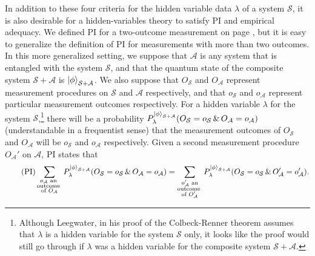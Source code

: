In addition to these four criteria for the hidden variable data $\lambda$ of a system $\mathcal{S}$, it is also desirable for a hidden-variables theory to satisfy PI and empirical adequacy. We defined PI for a two-outcome measurement on page \pageref{PIdef}, but it is easy to generalize the definition of PI for measurements with more than two outcomes. In this more generalized setting, we suppose that $\mathcal{A}$ is any system that is entangled with the system $\mathcal{S}$, and that the quantum state of the composite system $\mathcal{S}+\mathcal{A}$  is $\ket{\phi}_{\mathcal{S}+\mathcal{A}}$. We also suppose that $O_{\mathcal{S}}$ and $O_{\mathcal{A}}$  %
%
 represent measurement procedures on $\mathcal{S}$ and $\mathcal{A}$ respectively, and that $o_{\mathcal{S}}$ and $o_{\mathcal{A}}$  %
 represent particular measurement outcomes respectively. For a hidden variable $\lambda$ for the system $\mathcal{S}$,\footnote{Although Leegwater, in his proof of the Colbeck-Renner theorem assumes that $\lambda$ is a hidden variable for the system $\mathcal{S}$ only, it looks like the proof would still go through if $\lambda$ was a hidden variable for the composite system $\mathcal{S}+\mathcal{A}$.} there will be a probability $P_\lambda^{\ket{\phi}_{\mathcal{S}+\mathcal{A}}}(O_\mathcal{S}=o_\mathcal{S}\, \& \, O_\mathcal{A}=o_\mathcal{A})$ %
  (understandable in a frequentist sense) that the measurement outcomes of $O_{\mathcal{S}}$ and $O_{\mathcal{A}}$ will be $o_{\mathcal{S}}$  and $o_{\mathcal{A}}$ respectively. Given a second measurement procedure $O_{\mathcal{A}}'$ on $\mathcal{A}$, PI states that
\begin{equation}\tag{PI}
	\sum_{\substack{o_\mathcal{A}\text{ an }\\ \text{outcome }\\ 
	 \text{of }O_{\mathcal{A}}}}P_\lambda^{\ket{\phi}_{\mathcal{S}+\mathcal{A}}}(O_\mathcal{S}=o_\mathcal{S}\, \& \,O_\mathcal{A}=o_\mathcal{A}) = \sum_{\substack{o_\mathcal{A}'\text{ an}\\ \text{outcome }\\ 
	 \text{of }O_{\mathcal{A}}'}}P_\lambda^{\ket{\phi}_{\mathcal{S}+\mathcal{A}}}(O_\mathcal{S}=o_\mathcal{S}\, \& \,O'_\mathcal{A}=o'_\mathcal{A}). 
\end{equation}
